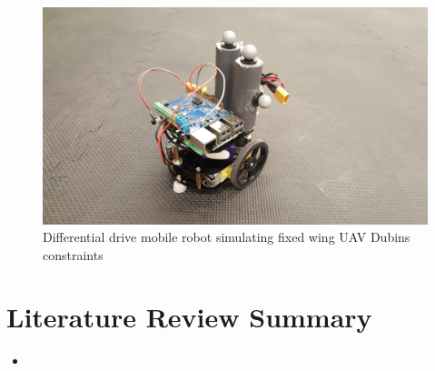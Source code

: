 \documentclass[numbered,pdftex]{ohio-etd}
\begin{document}
\begin{figure}
	\centering
	\includegraphics[width=12cm]{PaperFigures/robot}
	\caption{Differential drive mobile robot simulating fixed wing UAV Dubins constraints}
	\label{fig:robot}
\end{figure}



\section{Literature Review Summary}

\begin{itemize}
	\item 
\end{itemize}

   

\end{document}
